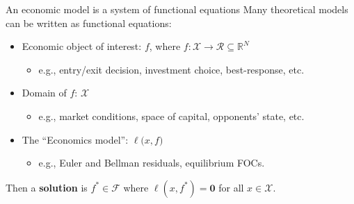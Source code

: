 \documentclass[aspectratio=169,10pt]{beamer}
\newcommand{\emphcolor}[1]{\textbf{\textcolor{emphcolorval}{#1}}}
\newcommand{\Xdom}{\mathcal{X}}
\newcommand{\F}{\mathcal{F}}
\begin{document}
\begin{frame}{An economic model is a system of functional equations}
	Many theoretical models can be written as functional equations:
	\begin{itemize}
		\item Economic object of interest: $f$, where $f : \Xdom\to \mathcal{R}\subseteq \mathbb{R}^N$
		\begin{itemize}
			\item e.g., entry/exit decision, investment choice, best-response, etc.
		\end{itemize}
		\vspace{0.1in}
		\item Domain of $f$: $\Xdom$
		\begin{itemize}
			\item e.g., market conditions, space of capital, opponents' state, etc.
		\end{itemize}
		\vspace{0.1in}
		\item The ``Economics model'': $\ell \big(x,f\big)$
		\begin{itemize}
			\item e.g., Euler and Bellman residuals, equilibrium FOCs.
		\end{itemize}
		\vspace{0.1in}
	\end{itemize}
	Then a \emphcolor{solution} is $f^*\in \F$ where $\ell(x,f^*) = \mathbf{0}$ for all $x \in \Xdom$.\vspace{0.1in}
\end{frame}
\end{document}
